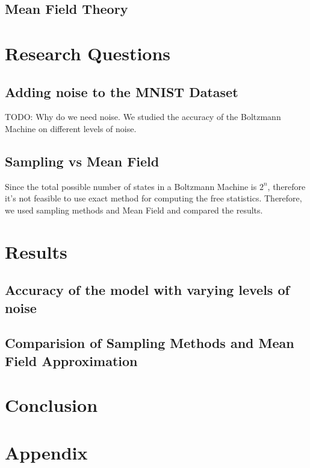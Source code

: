 \documentclass{article}
\begin{document}
\subsection*{Mean Field Theory}


\section*{Research Questions}
\subsection*{Adding noise to the MNIST Dataset}
TODO: Why do we need noise. We studied the accuracy of the Boltzmann Machine
on different levels of noise.

\subsection*{Sampling vs Mean Field}
Since the total possible number of states in a Boltzmann Machine is $ 2^n $, 
therefore it's not feasible to use exact method for computing the free 
statistics. Therefore, we used sampling methods and Mean Field and compared
the results.

\section*{Results}
\subsection*{Accuracy of the model with varying levels of noise}

\subsection{Comparision of Sampling Methods and Mean Field Approximation}

\section*{Conclusion}

\section*{Appendix}
\end{document}

